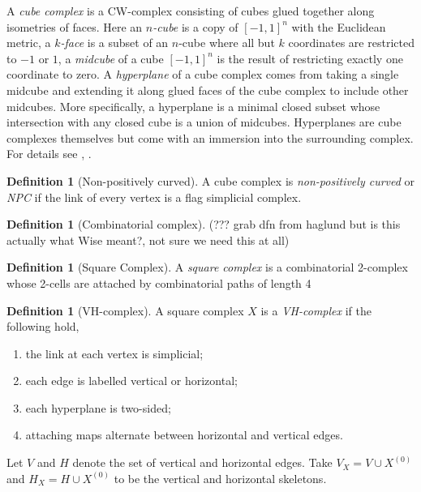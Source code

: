 \documentclass[12pt,parskip=full]{report}
\theoremstyle{plain}
\theoremstyle{definition}
\newtheorem{dfn}[thm]{Definition}
\begin{document}
A \emph{cube complex} is a CW-complex consisting of cubes glued together along isometries of faces. Here an \emph{\(n\)-cube} is a copy of \([-1,1]^n\) with the Euclidean metric, a \emph{\(k\)-face} is a subset of an \(n\)-cube where all but \(k\) coordinates are restricted to \(-1\) or \(1\), a \emph{midcube} of a cube \([-1,1]^n\) is the result of restricting exactly one coordinate to zero. A \emph{hyperplane} of a cube complex comes from taking a single midcube and extending it along glued faces of the cube complex to include other midcubes. More specifically, a hyperplane is a minimal closed subset whose intersection with any closed cube is a union of midcubes. Hyperplanes are cube complexes themselves but come with an immersion into the surrounding complex. For details see \cite{manning}, \cite{haglundwise}.

\begin{dfn}
    [Non-positively curved]
    A cube complex is \emph{non-positively curved} or \emph{NPC} if the link of every vertex is a flag simplicial complex.
\end{dfn}

\begin{dfn}
    [Combinatorial complex]
    (??? grab dfn from haglund but is this actually what Wise meant?, not sure we need this at all)
\end{dfn}

\begin{dfn}
    [Square Complex]
    A \emph{square complex} is a combinatorial 2-complex whose 2-cells are attached by combinatorial paths of length 4
\end{dfn}

\begin{dfn}
    [VH-complex]
    A square complex $X$ is a \emph{VH-complex} if the following hold,
    \begin{enumerate}
        \item the link at each vertex is simplicial;
        \item each edge is labelled vertical or horizontal;
        \item each hyperplane is two-sided;
        \item attaching maps alternate between horizontal and vertical edges.
    \end{enumerate}
    Let $V$ and $H$ denote the set of vertical and horizontal edges. Take $V_X = V \cup X^{(0)}$ and $H_X = H \cup X^{(0)}$ to be the vertical and horizontal skeletons. 
\end{dfn}
\end{document}
